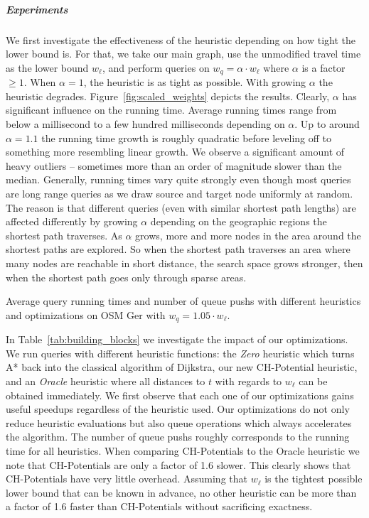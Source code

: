 \documentclass[letterpaper]{article} %
\begin{document}
\subparagraph{Experiments}
We first investigate the effectiveness of the heuristic depending on how tight the lower bound is.
For that, we take our main graph, use the unmodified travel time as the lower bound $w_\ell$, and perform queries on $w_q = \alpha \cdot w_\ell$ where $\alpha$ is a factor $\geq 1$.
When $\alpha = 1$, the heuristic is as tight as possible.
With growing $\alpha$ the heuristic degrades.
Figure~\ref{fig:scaled_weights} depicts the results.
Clearly, $\alpha$ has significant influence on the running time.
Average running times range from below a millisecond to a few hundred milliseconds depending on $\alpha$.
Up to around $\alpha = 1.1$ the running time growth is roughly quadratic before leveling off to something more resembling linear growth.
We observe a significant amount of heavy outliers -- sometimes more than an order of magnitude slower than the median.
Generally, running times vary quite strongly even though most queries are long range queries as we draw source and target node uniformly at random.
The reason is that different queries (even with similar shortest path lengths) are affected differently by growing $\alpha$ depending on the geographic regions the shortest path traverses.
As $\alpha$ grows, more and more nodes in the area around the shortest paths are explored.
So when the shortest path traverses an area where many nodes are reachable in short distance, the search space grows stronger, then when the shortest path goes only through sparse areas.

\begin{table}
\centering
\caption{Average query running times and number of queue pushs with different heuristics and optimizations on OSM Ger with $w_q = 1.05 \cdot w_\ell$.}\label{tab:building_blocks}

\end{table}

In Table~\ref{tab:building_blocks} we investigate the impact of our optimizations.
We run queries with different heuristic functions: the \emph{Zero} heuristic which turns A* back into the classical algorithm of Dijkstra, our new CH-Potential heuristic, and an \emph{Oracle} heuristic where all distances to $t$ with regards to $w_\ell$ can be obtained immediately.
We first observe that each one of our optimizations gains useful speedups regardless of the heuristic used.
Our optimizations do not only reduce heuristic evaluations but also queue operations which always accelerates the algorithm.
The number of queue pushs roughly corresponds to the running time for all heuristics.
When comparing CH-Potentials to the Oracle heuristic we note that CH-Potentials are only a factor of 1.6 slower.
This clearly shows that CH-Potentials have very little overhead.
Assuming that $w_\ell$ is the tightest possible lower bound that can be known in advance, no other heuristic can be more than a factor of 1.6 faster than CH-Potentials without sacrificing exactness.
\end{document}
